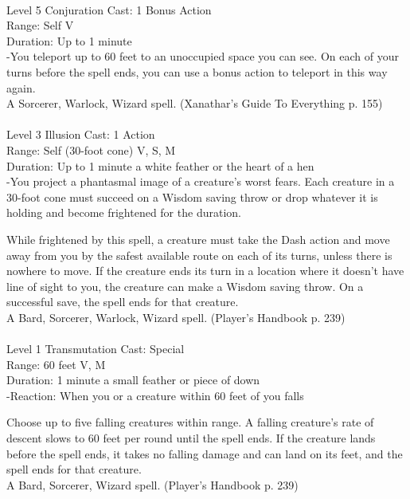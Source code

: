 \documentclass[10pt,twocolumn]{report}
\begin{document}
 \\
Level 5 \quad Conjuration \quad Cast: 1 Bonus Action\\
Range: Self \quad V\\
Duration: Up to 1 minute \quad \\
-You teleport up to 60 feet to an unoccupied space you can see. On each of your turns before the spell ends, you can use a bonus action to teleport in this way again.\\
A Sorcerer, Warlock, Wizard spell. (Xanathar's Guide To Everything p. 155) \\


 \\
Level 3 \quad Illusion \quad Cast: 1 Action\\
Range: Self (30-foot cone) \quad V, S, M\\
Duration: Up to 1 minute \quad a white feather or the heart of a hen\\
-You project a phantasmal image of a creature’s worst fears. Each creature in a 30-foot cone must succeed on a Wisdom saving throw or drop whatever it is holding and become frightened for the duration. 

While frightened by this spell, a creature must take the Dash action and move away from you by the safest available route on each of its turns, unless there is nowhere to move. If the creature ends its turn in a location where it doesn’t have line of sight to you, the creature can make a Wisdom saving throw. On a successful save, the spell ends for that creature.\\
A Bard, Sorcerer, Warlock, Wizard spell. (Player's Handbook p. 239) \\


 \\
Level 1 \quad Transmutation \quad Cast: Special\\
Range: 60 feet \quad V, M\\
Duration: 1 minute \quad a small feather or piece of down\\
-Reaction: When you or a creature within 60 feet of you falls 

Choose up to five falling creatures within range. A falling creature’s rate of descent slows to 60 feet per round until the spell ends. If the creature lands before the spell ends, it takes no falling damage and can land on its feet, and the spell ends for that creature.\\
A Bard, Sorcerer, Wizard spell. (Player's Handbook p. 239) \\
\end{document}

